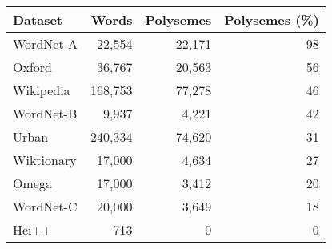 \small
\begin{tabular}{|l|rrr|}
    \hline
    Dataset    & Words   & Polysemes & Polysemes (\%) \\
    \hline
    WordNet-A  & 22,554  & 22,171    & 98             \\
    Oxford     & 36,767  & 20,563    & 56             \\
    Wikipedia  & 168,753 & 77,278    & 46             \\
    WordNet-B  & 9,937   & 4,221     & 42             \\
    Urban      & 240,334 & 74,620    & 31             \\
    Wiktionary & 17,000  & 4,634     & 27             \\
    Omega      & 17,000  & 3,412     & 20             \\
    WordNet-C  & 20,000  & 3,649     & 18             \\
    Hei++      & 713     & 0         & 0              \\
    \hline
\end{tabular}
